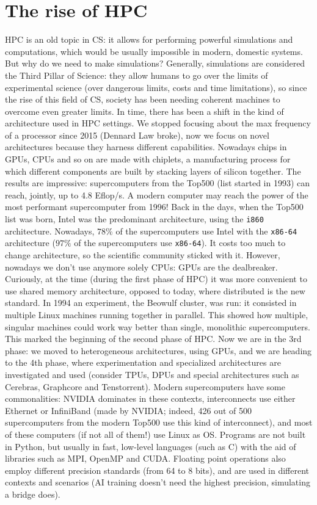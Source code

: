 \chapter{The rise of HPC}

HPC is an old topic in CS: it allows for performing powerful simulations and computations, which would be usually impossible in modern, domestic systems. But why do we need to make simulations? Generally, simulations are considered the Third Pillar of Science: they allow humans to go over the limits of experimental science (over dangerous limits, costs and time limitations), so since the rise of this field of CS, society has been needing coherent machines to overcome even greater limits.
\nwl
In time, there has been a shift in the kind of architecture used in HPC settings. We stopped focusing about the max frequency of a processor since 2015 (Dennard Law broke), now we focus on novel architectures because they harness different capabilities. Nowadays chips in GPUs, CPUs and so on are made with chiplets, a manufacturing process for which different components are built by stacking layers of silicon together.
\nwl
The results are impressive: supercomputers from the Top500 (list started in 1993) can reach, jointly, up to 4.8 Eflop/s. A modern computer may reach the power of the most performant supercomputer from 1996!
\nwl
Back in the days, when the Top500 list was born, Intel was the predominant architecture, using the \verb|i860| architecture. Nowadays, $78\%$ of the supercomputers use Intel with the \verb|x86-64| architecture ($97\%$ of the supercomputers use \verb|x86-64|). It costs too much to change architecture, so the scientific community sticked with it. However, nowadays we don't use anymore solely CPUs: GPUs are the dealbreaker.
\nwl
Curiously, at the time (during the first phase of HPC) it was more convenient to use shared memory architecture, opposed to today, where distributed is the new standard. In 1994 an experiment, the Beowulf cluster, was run: it consisted in multiple Linux machines running together in parallel. This showed how multiple, singular machines could work way better than single, monolithic supercomputers. This marked the beginning of the second phase of HPC. Now we are in the 3rd phase: we moved to heterogeneous architectures, using GPUs, and we are heading to the 4th phase, where experimentation and specialized architectures are investigated and used (consider TPUs, DPUs and special architectures such as Cerebras, Graphcore and Tenstorrent).
\nwl
Modern supercomputers have some commonalities: NVIDIA dominates in these contexts, interconnects use either Ethernet or InfiniBand (made by NVIDIA; indeed, 426 out of 500 supercomputers from the modern Top500 use this kind of interconnect), and most of these computers (if not all of them!) use Linux as OS.
\nwl
Programs are not built in Python, but usually in fast, low-level languages (such as C) with the aid of libraries such as MPI, OpenMP and CUDA. Floating point operations also employ different precision standards (from 64 to 8 bits), and are used in different contexts and scenarios (AI training doesn't need the highest precision, simulating a bridge does).

